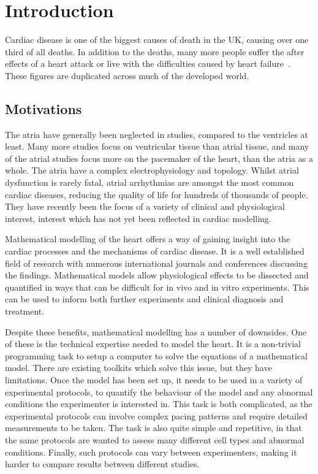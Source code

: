 \chapter{Introduction}

Cardiac disease is one of the biggest causes of death in the UK, causing over
one third of all deaths.
In addition to the deaths, many more people suffer the after effects of a heart
attack or live with the difficulties caused by heart failure~\cite{bhf2008}.
These figures are duplicated across much of the developed world.


\section{Motivations}

The atria have generally been neglected in studies, compared to the ventricles
at least.
Many more studies focus on ventricular tissue than atrial tissue, and many of
the atrial studies focus more on the pacemaker of the heart, than the atria as a
whole.
The atria have a complex electrophysiology and topology.
Whilst atrial dysfunction is rarely fatal, atrial arrhythmias are amongst the
most common cardiac diseases, reducing the quality of life for hundreds of
thousands of people.
They have recently been the focus of a variety of clinical and physiological
interest, interest which has not yet been reflected in cardiac modelling.

Mathematical modelling of the heart offers a way of gaining insight into the
cardiac processes and the mechanisms of cardiac disease.
It is a well established field of research with numerous international journals
and conferences discussing the findings.
Mathematical models allow physiological effects to be dissected and quantified
in ways that can be difficult for in vivo and in vitro experiments.
This can be used to inform both further experiments and clinical diagnosis and
treatment.

Despite these benefits, mathematical modelling has a number of downsides.
One of these is the technical expertise needed to model the heart.
It is a non-trivial programming task to setup a computer to solve the equations
of a mathematical model.
There are existing toolkits which solve this issue, but they have limitations.
Once the model has been set up, it needs to be used in a variety of experimental
protocols, to quantify the behaviour of the model and any abnormal conditions
the experimenter is interested in.
This task is both complicated, as the experimental protocols can involve complex
pacing patterns and require detailed measurements to be taken.
The task is also quite simple and repetitive, in that the same protocols are
wanted to assess many different cell types and abnormal conditions.
Finally, such protocols can vary between experimenters, making it harder to
compare results between different studies.

